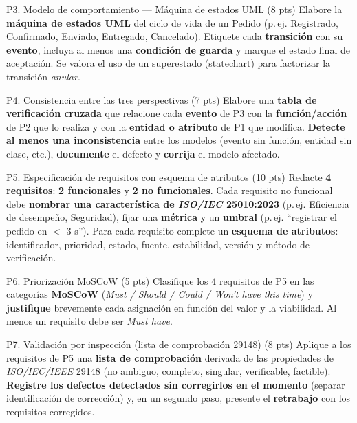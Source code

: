 \documentclass[11pt,a4paper,oneside]{article}
\begin{document}
\begin{tarea}{P3. Modelo de comportamiento --- M\'aquina de estados UML \hfill (8 pts)}
Elabore la \textbf{m\'aquina de estados UML} del ciclo de vida de un \textsf{Pedido} (p.\,ej. \textsf{Registrado}, \textsf{Confirmado}, \textsf{Enviado}, \textsf{Entregado}, \textsf{Cancelado}). Etiquete cada \textbf{transici\'on} con su \textbf{evento}, incluya al menos una \textbf{condici\'on de guarda} y marque el estado final de aceptaci\'on. Se valora el uso de un superestado (statechart) para factorizar la transici\'on \emph{anular}.
\end{tarea}

\begin{tarea}{P4. Consistencia entre las tres perspectivas \hfill (7 pts)}
Elabore una \textbf{tabla de verificaci\'on cruzada} que relacione cada \textbf{evento} de P3 con la \textbf{funci\'on/acci\'on} de P2 que lo realiza y con la \textbf{entidad o atributo} de P1 que modifica. \textbf{Detecte al menos una inconsistencia} entre los modelos (evento sin funci\'on, entidad sin clase, etc.), \textbf{documente} el defecto y \textbf{corrija} el modelo afectado.
\end{tarea}

\begin{tarea}{P5. Especificaci\'on de requisitos con esquema de atributos \hfill (10 pts)}
Redacte \textbf{4 requisitos}: \textbf{2 funcionales} y \textbf{2 no funcionales}. Cada requisito no funcional debe \textbf{nombrar una caracter\'istica de \textit{ISO/IEC} 25010:2023} (p.\,ej. Eficiencia de desempe\~no, Seguridad), fijar una \textbf{m\'etrica} y un \textbf{umbral} (p.\,ej. ``registrar el pedido en $<$ 3 s''). Para cada requisito complete un \textbf{esquema de atributos}: identificador, prioridad, estado, fuente, estabilidad, versi\'on y m\'etodo de verificaci\'on.
\end{tarea}

\begin{tarea}{P6. Priorizaci\'on MoSCoW \hfill (5 pts)}
Clasifique los 4 requisitos de P5 en las categor\'ias \textbf{MoSCoW} (\textit{Must / Should / Could / Won't have this time}) y \textbf{justifique} brevemente cada asignaci\'on en funci\'on del valor y la viabilidad. Al menos un requisito debe ser \textit{Must have}.
\end{tarea}

\begin{tarea}{P7. Validaci\'on por inspecci\'on (lista de comprobaci\'on 29148) \hfill (8 pts)}
Aplique a los requisitos de P5 una \textbf{lista de comprobaci\'on} derivada de las propiedades de \textit{ISO/IEC/IEEE} 29148 (no ambiguo, completo, singular, verificable, factible). \textbf{Registre los defectos detectados sin corregirlos en el momento} (separar identificaci\'on de correcci\'on) y, en un segundo paso, presente el \textbf{retrabajo} con los requisitos corregidos.
\end{tarea}
\end{document}
